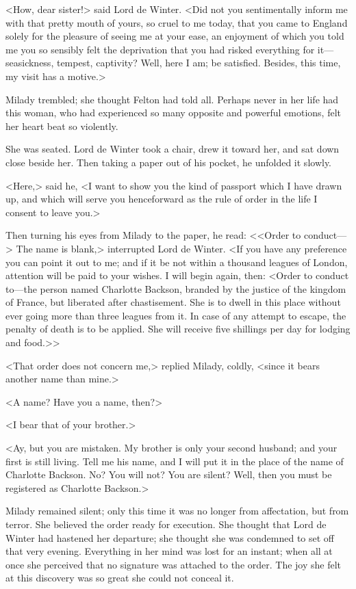 <How, dear sister!> said Lord de Winter. <Did not you sentimentally inform me with that pretty mouth of yours, so cruel to me today, that you came to England solely for the pleasure of seeing me at your ease, an enjoyment of which you told me you so sensibly felt the deprivation that you had risked everything for it—seasickness, tempest, captivity? Well, here I am; be satisfied. Besides, this time, my visit has a motive.> 

Milady trembled; she thought Felton had told all. Perhaps never in her life had this woman, who had experienced so many opposite and powerful emotions, felt her heart beat so violently. 

She was seated. Lord de Winter took a chair, drew it toward her, and sat down close beside her. Then taking a paper out of his pocket, he unfolded it slowly. 

<Here,> said he, <I want to show you the kind of passport which I have drawn up, and which will serve you henceforward as the rule of order in the life I consent to leave you.> 

Then turning his eyes from Milady to the paper, he read: <<Order to conduct—> The name is blank,> interrupted Lord de Winter. <If you have any preference you can point it out to me; and if it be not within a thousand leagues of London, attention will be paid to your wishes. I will begin again, then: <Order to conduct to—the person named Charlotte Backson, branded by the justice of the kingdom of France, but liberated after chastisement. She is to dwell in this place without ever going more than three leagues from it. In case of any attempt to escape, the penalty of death is to be applied. She will receive five shillings per day for lodging and food.>>

<That order does not concern me,> replied Milady, coldly, <since it bears another name than mine.> 

<A name? Have you a name, then?> 

<I bear that of your brother.> 

<Ay, but you are mistaken. My brother is only your second husband; and your first is still living. Tell me his name, and I will put it in the place of the name of Charlotte Backson. No? You will not? You are silent? Well, then you must be registered as Charlotte Backson.> 

Milady remained silent; only this time it was no longer from affectation, but from terror. She believed the order ready for execution. She thought that Lord de Winter had hastened her departure; she thought she was condemned to set off that very evening. Everything in her mind was lost for an instant; when all at once she perceived that no signature was attached to the order. The joy she felt at this discovery was so great she could not conceal it. 

